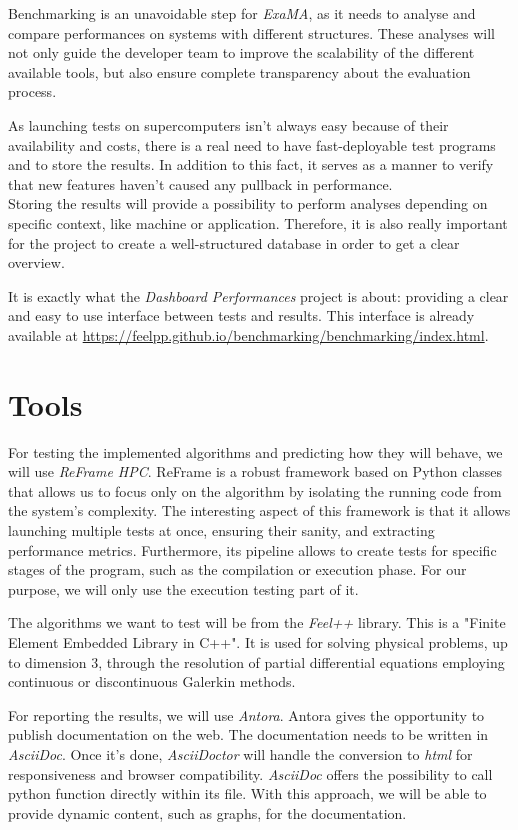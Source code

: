 \documentclass[12pt]{article}
\begin{document}
Benchmarking is an unavoidable step for \textit{ExaMA}, as it needs to analyse and compare performances on systems
with different structures. These analyses will not only guide the developer team to improve the scalability of the different available tools,
but also ensure complete transparency about the evaluation process.


As launching tests on supercomputers isn't always easy because of their availability and costs, there is a real need to have fast-deployable test programs and to store the results.
In addition to this fact, it serves as a manner to verify that new features haven't caused any pullback in performance. \\
Storing the results will provide a possibility to perform analyses depending on specific context, like machine or application.
Therefore, it is also really important for the project to create a well-structured database in order to get a clear overview.

It is exactly what the \textit{Dashboard Performances} project is about: providing a clear and easy to use interface between tests and results.
This interface is already available at \url{https://feelpp.github.io/benchmarking/benchmarking/index.html}.


\section{Tools}

For testing the implemented algorithms and predicting how they will behave, we will use \textit{ReFrame HPC}\cite*{ReFrame}.
ReFrame is a robust framework based on Python classes that allows us to focus only on the algorithm by isolating the running code from the system's complexity.
The interesting aspect of this framework is that it allows launching multiple tests at once, ensuring their sanity, and extracting performance metrics.
Furthermore, its pipeline allows to create tests for specific stages of the program, such as the compilation or execution phase. 
For our purpose, we will only use the execution testing part of it.

The algorithms we want to test will be from the \textit{Feel++}\cite*{Feelpp} library.
This is a "Finite Element Embedded Library in C++". It is used for solving physical problems, up to dimension 3,
through the resolution of partial differential equations employing continuous or discontinuous Galerkin methods. 

For reporting the results, we will use \textit{Antora}\cite*{Antora}. Antora gives the opportunity to publish documentation on the web.
The documentation needs to be written in \textit{AsciiDoc}. Once it's done, \textit{AsciiDoctor} will handle the conversion to \textit{html}
for responsiveness and browser compatibility.
\textit{AsciiDoc} offers the possibility to call python function directly within its file. With this approach, we will be able to provide dynamic content,
such as graphs, for the documentation.
\end{document}
